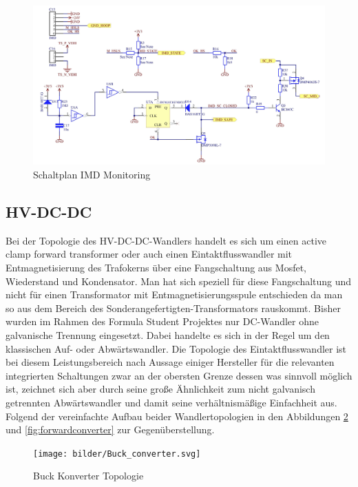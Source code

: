 \begin{figure}
	\centering
	\includegraphics[width=0.9\linewidth]{"bilder/IMD Monitoring schematic"}
	\caption{Schaltplan IMD Monitoring}
	\label{fig:imd-monitoring-schematic}
\end{figure}

\FloatBarrier
\subsection{\ac{HV}-DC-DC}
Bei der Topologie des \ac{HV}-DC-DC-Wandlers handelt es sich um einen active clamp forward transformer oder auch einen Eintaktflusswandler mit Entmagnetisierung des Trafokerns über eine Fangschaltung aus Mosfet, Wiederstand und Kondensator. Man hat sich speziell für diese Fangschaltung und nicht für einen Transformator mit Entmagnetisierungsspule entschieden da man so aus dem Bereich des Sonderangefertigten-Transformators rauskommt. Bisher wurden im Rahmen des Formula Student Projektes nur DC-Wandler ohne galvanische Trennung eingesetzt. Dabei handelte es sich in der Regel um den klassischen Auf- oder Abwärtswandler. Die Topologie des Eintaktflusswandler ist bei diesem Leistungsbereich nach Aussage einiger Hersteller für die relevanten integrierten Schaltungen zwar an der obersten Grenze dessen was sinnvoll möglich ist, zeichnet sich aber durch seine große Ähnlichkeit zum nicht galvanisch getrennten Abwärtswandler und damit seine verhältnismäßige Einfachheit aus. Folgend der vereinfachte Aufbau beider Wandlertopologien in den Abbildungen \ref{fig:buckconverter} und \ref{fig:forwardconverter} zur Gegenüberstellung.

\begin{figure}
	\centering
	\texttt{[image: bilder/Buck\_converter.svg]}
	\caption{Buck Konverter Topologie \cite{WikiWandlertopo}}
	\label{fig:buckconverter}
\end{figure}

